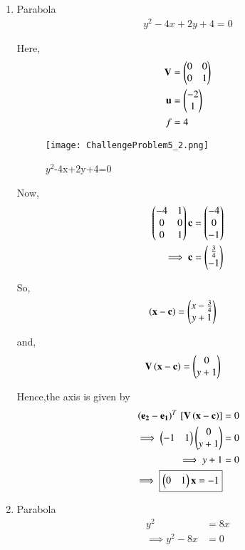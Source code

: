 \documentclass[journal,12pt,twocolumn]{IEEEtran}
\begin{document}
\begin{enumerate}
    \item Parabola
    \begin{align}
    y^2-4x+2y+4 = 0
    \end{align}
    
    Here,
    \begin{align}
    \mathbf{V} &= \begin{pmatrix}0 & 0 \\ 0 & 1\end{pmatrix} \\
    \mathbf{u} &= \begin{pmatrix}-2 \\ 1\end{pmatrix} \\
    f &= 4
    \end{align}

    \begin{figure}[!ht]
    \centering
    \texttt{[image: ChallengeProblem5\_2.png]}
    \caption{$y^2$-4x+2y+4=0}
    \label{ex2}	
    \end{figure}
    Now,
    \begin{align}
    \begin{pmatrix}-4 & 1 \\ 0 & 0 \\ 0 & 1\end{pmatrix}\mathbf{c} &= \begin{pmatrix}-4 \\ 0 \\ -1\end{pmatrix}
    \\
    \implies \mathbf{c} &= \begin{pmatrix}\frac{3}{4} \\ -1\end{pmatrix}
    \end{align}

    So,
    \begin{align}
    \left(\mathbf{x}-\mathbf{c}\right) &= \begin{pmatrix}x-\frac{3}{4} \\  y+1\end{pmatrix}
    \end{align}

    and,
    \begin{align}
    \mathbf{V}\left(\mathbf{x}-\mathbf{c}\right) &= \begin{pmatrix}0 \\ y+1\end{pmatrix}
    \end{align}

    Hence,the axis is given by
    \begin{align}
    \left(\mathbf{e_2}-\mathbf{e_1}\right)^T{}\left[\mathbf{V}\left(\mathbf{x}-\mathbf{c}\right)\right] &= 0\\
    \implies \begin{pmatrix}-1 & 1\end{pmatrix}\begin{pmatrix}0 \\ y+1\end{pmatrix} &= 0 \\
    \implies y+1 &= 0 \\
    \implies \boxed{\begin{pmatrix}0 & 1\end{pmatrix}\mathbf{x} = -1}
    \end{align}
    
    \item Parabola
    \begin{align}
        y^2 &= 8x
        \\
        \implies y^2-8x &= 0
    \end{align}
    

\end{enumerate}
\end{document}
